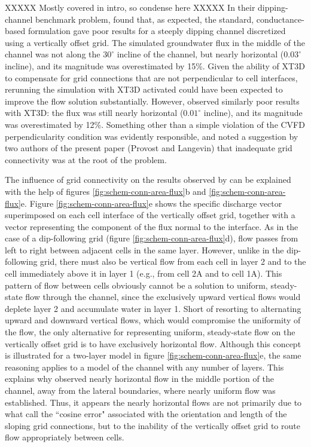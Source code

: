 \documentclass{article}
\begin{document}
XXXXX Mostly covered in intro, so condense here XXXXX In their dipping-channel benchmark problem, \cite{bardot2022} found that, as expected, the standard, conductance-based formulation gave poor results for a steeply dipping channel discretized using a vertically offset grid. The simulated groundwater flux in the middle of the channel was not along the $30^{\circ}$ incline of the channel, but nearly horizontal ($0.03^{\circ}$ incline), and its magnitude was overestimated by 15\%. Given the ability of XT3D to compensate for grid connections that are not perpendicular to cell interfaces, rerunning the simulation with XT3D activated could have been expected to improve the flow solution substantially. However, \cite{bardot2022} observed similarly poor results with XT3D: the flux was still nearly horizontal ($0.01^{\circ}$ incline), and its magnitude was overestimated by 12\%. Something other than a simple violation of the CVFD perpendicularity condition was evidently responsible, and \cite{bardot2022} noted a suggestion by two authors of the present paper (Provost and Langevin) that inadequate grid connectivity was at the root of the problem.

The influence of grid connectivity on the results observed by \cite{bardot2022} can be explained with the help of figures \ref{fig:schem-conn-area-flux}b and \ref{fig:schem-conn-area-flux}e. Figure \ref{fig:schem-conn-area-flux}e shows the specific discharge vector superimposed on each cell interface of the vertically offset grid, together with a vector representing the component of the flux normal to the interface. As in the case of a dip-following grid (figure \ref{fig:schem-conn-area-flux}d), flow passes from left to right between adjacent cells in the same layer. However, unlike in the dip-following grid, there must also be vertical flow from each cell in layer 2 and to the cell immediately above it in layer 1 (e.g., from cell 2A and to cell 1A). This pattern of flow between cells obviously cannot be a solution to uniform, steady-state flow through the channel, since the exclusively upward vertical flows would deplete layer 2 and accumulate water in layer 1. Short of resorting to alternating upward and downward vertical flows, which would compromise the uniformity of the flow, the only alternative for representing uniform, steady-state flow on the vertically offset grid is to have exclusively horizontal flow. Although this concept is illustrated for a two-layer model in figure \ref{fig:schem-conn-area-flux}e, the same reasoning applies to a model of the channel with any number of layers. This explains why \cite{bardot2022} observed nearly horizontal flow in the middle portion of the channel, away from the lateral boundaries, where nearly uniform flow was established. Thus, it appears the nearly horizontal flows are not primarily due to what \cite{bardot2022} call the ``cosine error" associated with the orientation and length of the sloping grid connections, but to the inability of the vertically offset grid to route flow appropriately between cells.
\end{document}
